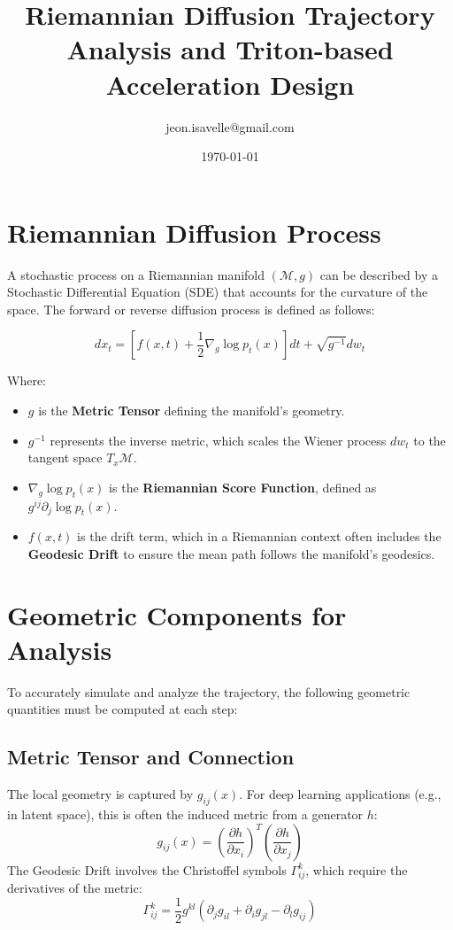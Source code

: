 \documentclass{article}
\title{Riemannian Diffusion Trajectory Analysis and Triton-based Acceleration Design}
\author{jeon.isavelle@gmail.com}
\date{\today}
\begin{document}
\maketitle

\section{Riemannian Diffusion Process}
A stochastic process on a Riemannian manifold $(\mathcal{M}, g)$ can be described by a Stochastic Differential Equation (SDE) that accounts for the curvature of the space. The forward or reverse diffusion process is defined as follows:

\begin{equation}
    dx_t = \left[ f(x, t) + \frac{1}{2} \nabla_g \log p_t(x) \right] dt + \sqrt{g^{-1}} dw_t
\end{equation}

Where:
\begin{itemize}
    \item $g$ is the \textbf{Metric Tensor} defining the manifold's geometry.
    \item $g^{-1}$ represents the inverse metric, which scales the Wiener process $dw_t$ to the tangent space $T_x\mathcal{M}$.
    \item $\nabla_g \log p_t(x)$ is the \textbf{Riemannian Score Function}, defined as $g^{ij} \partial_j \log p_t(x)$.
    \item $f(x, t)$ is the drift term, which in a Riemannian context often includes the \textbf{Geodesic Drift} to ensure the mean path follows the manifold's geodesics.
\end{itemize}

\section{Geometric Components for Analysis}
To accurately simulate and analyze the trajectory, the following geometric quantities must be computed at each step:

\subsection{Metric Tensor and Connection}
The local geometry is captured by $g_{ij}(x)$. For deep learning applications (e.g., in latent space), this is often the induced metric from a generator $h$:
\begin{equation}
    g_{ij}(x) = \left( \frac{\partial h}{\partial x_i} \right)^T \left( \frac{\partial h}{\partial x_j} \right)
\end{equation}
The Geodesic Drift involves the Christoffel symbols $\Gamma_{ij}^k$, which require the derivatives of the metric:
\begin{equation}
    \Gamma_{ij}^k = \frac{1}{2} g^{kl} (\partial_j g_{il} + \partial_i g_{jl} - \partial_l g_{ij})
\end{equation}
\end{document}
